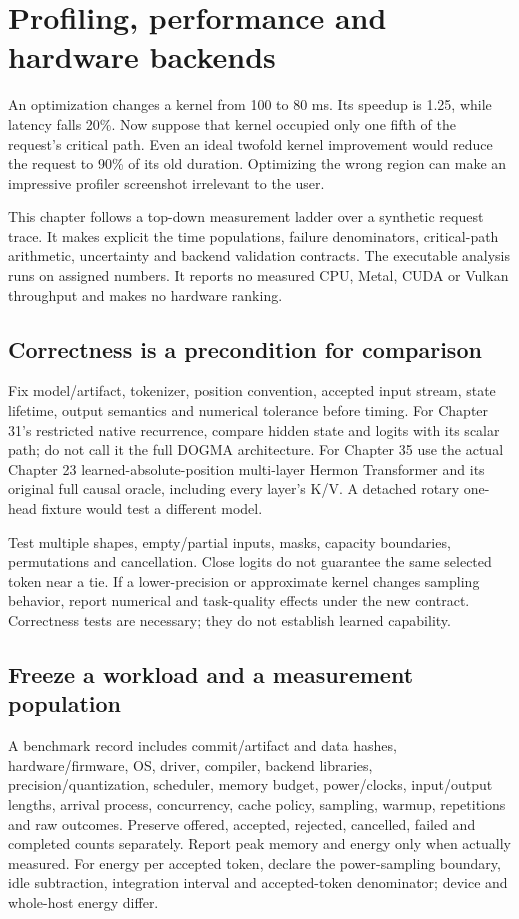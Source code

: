 \chapter{Profiling, performance and hardware backends}
\label{evod47:chapter}

An optimization changes a kernel from 100 to 80 ms. Its speedup is 1.25, while
latency falls 20\%. Now suppose that kernel occupied only one fifth of the
request's critical path. Even an ideal twofold kernel improvement would reduce
the request to 90\% of its old duration. Optimizing the wrong region can make
an impressive profiler screenshot irrelevant to the user.

This chapter follows a top-down measurement ladder over a synthetic request trace.
It makes explicit the time populations, failure denominators,
critical-path arithmetic, uncertainty and backend validation contracts.
The executable analysis runs on assigned numbers. It reports no measured
CPU, Metal, CUDA or Vulkan throughput and makes no hardware ranking.

\section{Correctness is a precondition for comparison}
\label{evod47:correct}
Fix model/artifact, tokenizer, position convention, accepted input stream,
state lifetime, output semantics and numerical tolerance before timing.
For Chapter 31's restricted native recurrence, compare hidden state and logits
with its scalar path; do not call it the full DOGMA architecture. For Chapter
35 use the actual Chapter 23 learned-absolute-position multi-layer Hermon
Transformer and its original full causal oracle, including every layer's K/V.
A detached rotary one-head fixture would test a different model.

Test multiple shapes, empty/partial inputs, masks, capacity boundaries,
permutations and cancellation. Close logits do not guarantee the same selected
token near a tie. If a lower-precision or approximate kernel changes sampling
behavior, report numerical and task-quality effects under the new contract.
Correctness tests are necessary; they do not establish learned capability.

\section{Freeze a workload and a measurement population}
\label{evod47:workload}
A benchmark record includes commit/artifact and data hashes, hardware/firmware,
OS, driver, compiler, backend libraries, precision/quantization, scheduler,
memory budget, power/clocks, input/output lengths, arrival process, concurrency,
cache policy, sampling, warmup, repetitions and raw outcomes. Preserve offered,
accepted, rejected, cancelled, failed and completed counts separately.
Report peak memory and energy only when actually measured. For energy per
accepted token, declare the power-sampling boundary, idle subtraction, integration
interval and accepted-token denominator; device and whole-host energy differ.


